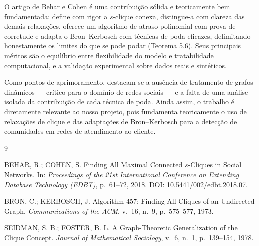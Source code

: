 \documentclass[12pt]{article}
\begin{document}
O artigo de Behar e Cohen é uma contribuição sólida e teoricamente bem
fundamentada: define com rigor a $s$-clique conexa, distingue-a com clareza das
demais relaxações, oferece um algoritmo de atraso polinomial com prova de
corretude e adapta o Bron--Kerbosch com técnicas de poda eficazes, delimitando
honestamente os limites do que se pode podar (Teorema 5.6). Seus principais
méritos são o equilíbrio entre flexibilidade do modelo e tratabilidade
computacional, e a validação experimental sobre dados reais e sintéticos.

Como pontos de aprimoramento, destacam-se a ausência de tratamento de grafos
dinâmicos --- crítico para o domínio de redes sociais --- e a falta de uma
análise isolada da contribuição de cada técnica de poda. Ainda assim, o trabalho
é diretamente relevante ao nosso projeto, pois fundamenta teoricamente o uso de
relaxações de clique e das adaptações de Bron--Kerbosch para a detecção de
comunidades em redes de atendimento ao cliente.

\begin{thebibliography}{9}

BEHAR, R.; COHEN, S.
Finding All Maximal Connected $s$-Cliques in Social Networks.
In: \emph{Proceedings of the 21st International Conference on Extending Database
Technology (EDBT)}, p.~61--72, 2018. DOI: 10.5441/002/edbt.2018.07.

BRON, C.; KERBOSCH, J.
Algorithm 457: Finding All Cliques of an Undirected Graph.
\emph{Communications of the ACM}, v.~16, n.~9, p.~575--577, 1973.

SEIDMAN, S. B.; FOSTER, B. L.
A Graph-Theoretic Generalization of the Clique Concept.
\emph{Journal of Mathematical Sociology}, v.~6, n.~1, p.~139--154, 1978.

\end{thebibliography}
\end{document}
